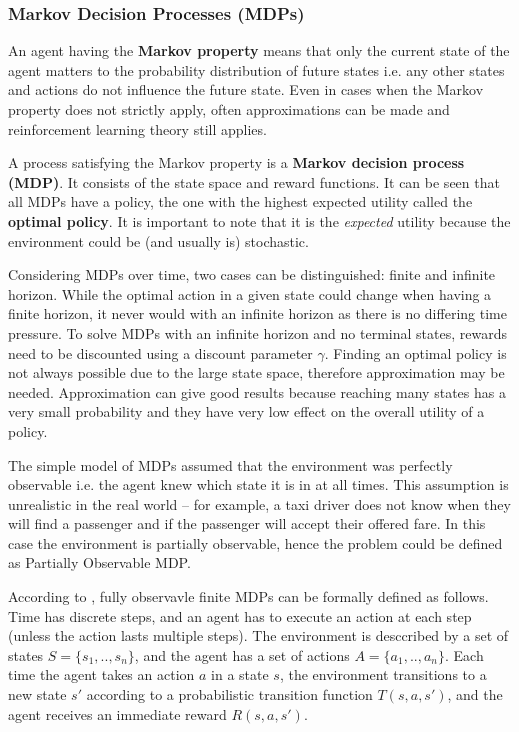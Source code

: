 \subsubsection{Markov Decision Processes (MDPs)}
\label{sec:literature:ai:mdp}

An agent having the \textbf{Markov property} means that only the current state
of the agent matters to the probability distribution of future states i.e. any
other states and actions do not influence the future state. Even in cases when
the Markov property does not strictly apply, often approximations can be made
and reinforcement learning theory still applies.
\parencite{Sutton1998ai+reinforcement}

A process satisfying the Markov property is a \textbf{Markov decision process
(MDP)}. It consists of the state space and reward functions. It can be seen
that all MDPs have a policy, the one with the highest expected utility called
the \textbf{optimal policy}. It is important to note that it is the
\textit{expected} utility because the environment could be (and usually is)
stochastic. \parencite{Russell2010ai+modern}

Considering MDPs over time, two cases can be distinguished: finite and infinite
horizon. While the optimal action in a given state could change when having a
finite horizon, it never would with an infinite horizon as there is no
differing time pressure. To solve MDPs with an infinite horizon and no terminal
states, rewards need to be discounted using a discount parameter \(\gamma\).
Finding an optimal policy is not always possible due to the large state space,
therefore approximation may be needed. Approximation can give good results
because reaching many states has a very small probability and they have very
low effect on the overall utility of a policy. \parencite{Russell2010ai+modern}

The simple model of MDPs assumed that the environment was perfectly observable
i.e. the agent knew which state it is in at all times. This assumption is
unrealistic in the real world -- for example, a taxi driver does not know when
they will find a passenger and if the passenger will accept their offered fare.
In this case the environment is partially observable, hence the problem could
be defined as Partially Observable MDP.

According to \textcite{Spaan2012ai+pomdp}, fully observavle finite MDPs can be
formally defined as follows. Time has discrete steps, and an agent has to
execute an action at each step (unless the action lasts multiple steps). The
environment is desccribed by a set of states \(S = \{s_1,..,s_n\}\), and the
agent has a set of actions \(A = \{a_1,..,a_n\}\). Each time the agent takes an
action \(a\) in a state \(s\), the environment transitions to a new state
\(s'\) according to a probabilistic transition function \(T(s,a,s')\), and the
agent receives an immediate reward \(R(s,a,s')\).

